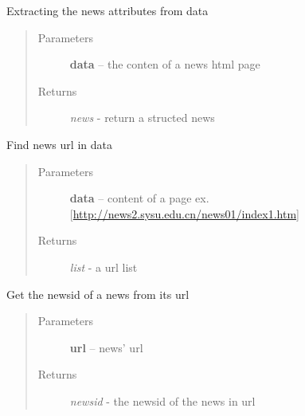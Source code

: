 \documentclass[letterpaper,10pt,english]{sphinxmanual}
\begin{document}
\begin{fulllineitems}
\label{sysunews:sysunews.html_extracting.find_news}
Extracting the news attributes from data
\begin{quote}\begin{description}
\item[{Parameters}] \leavevmode
\textbf{data} -- the conten of a news html page

\item[{Returns}] \leavevmode
\emph{news} - return a structed news

\end{description}\end{quote}

\end{fulllineitems}


\begin{fulllineitems}
\label{sysunews:sysunews.html_extracting.find_news_urls}
Find news url in data
\begin{quote}\begin{description}
\item[{Parameters}] \leavevmode
\textbf{data} -- content of a page ex.{[}\href{http://news2.sysu.edu.cn/news01/index1.htm}{http://news2.sysu.edu.cn/news01/index1.htm}{]}

\item[{Returns}] \leavevmode
\emph{list} - a url list

\end{description}\end{quote}

\end{fulllineitems}


\begin{fulllineitems}
\label{sysunews:sysunews.html_extracting.find_newsid}
Get the newsid of a news from its url
\begin{quote}\begin{description}
\item[{Parameters}] \leavevmode
\textbf{url} -- news' url

\item[{Returns}] \leavevmode
\emph{newsid} - the newsid of the news in url

\end{description}\end{quote}

\end{fulllineitems}
\end{document}
